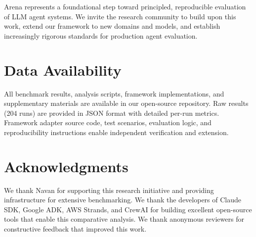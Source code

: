 \documentclass[sigconf,nonacm]{acmart}
\begin{document}
Arena represents a foundational step toward principled, reproducible evaluation of LLM agent systems. We invite the research community to build upon this work, extend our framework to new domains and models, and establish increasingly rigorous standards for production agent evaluation.

\section{Data Availability}

All benchmark results, analysis scripts, framework implementations, and supplementary materials are available in our open-source repository. Raw results (204 runs) are provided in JSON format with detailed per-run metrics. Framework adapter source code, test scenarios, evaluation logic, and reproducibility instructions enable independent verification and extension.

\section{Acknowledgments}

We thank Navan for supporting this research initiative and providing infrastructure for extensive benchmarking. We thank the developers of Claude SDK, Google ADK, AWS Strands, and CrewAI for building excellent open-source tools that enable this comparative analysis. We thank anonymous reviewers for constructive feedback that improved this work.
\end{document}
